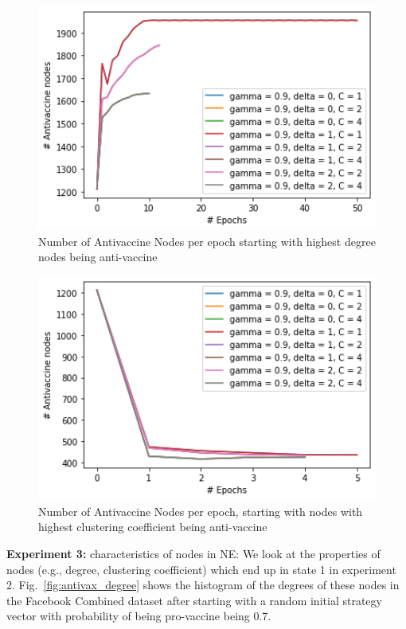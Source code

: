 \begin{figure}[H]
    \centering
    \includegraphics[width=12cm]{figs/exp2-diff-params-degree.png}
    \caption{Number of Antivaccine Nodes per epoch starting with highest degree nodes being anti-vaccine}
    \label{fig:exp2-diff-params-degree}
\end{figure}


\begin{figure}[H]
    \centering
    \includegraphics[width=12cm]{figs/exp2-diff-params-cluster.png}
    \caption{Number of Antivaccine Nodes per epoch, starting with nodes with highest clustering coefficient being anti-vaccine}
    \label{fig:exp2-diff-params-cluster}
\end{figure}



\noindent
\textbf{Experiment 3:} characteristics of nodes in NE: We look at the properties of nodes (e.g., degree, clustering coefficient) which end up in state 1 in experiment 2. Fig.~\ref{fig:antivax_degree} shows the histogram of the degrees of these nodes in the Facebook Combined dataset after starting with a random initial strategy vector with probability of being pro-vaccine being 0.7.


